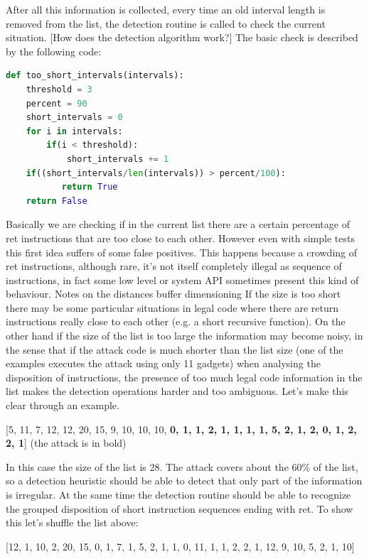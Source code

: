 \documentclass[Lau,binding=0.6cm]{sapthesis}
\begin{document}
After all this information is collected, every time an old interval length is removed from the list, the detection routine is called to check the current situation.
[How does the detection algorithm work?]
The basic check is described by the following code:

\begin{lstlisting}[language=Python]
def too_short_intervals(intervals):
    threshold = 3
    percent = 90
    short_intervals = 0
    for i in intervals:
        if(i < threshold):
            short_intervals += 1
    if((short_intervals/len(intervals)) > percent/100):
           return True
    return False
\end{lstlisting}

Basically we are checking if in the current list there are a certain percentage of ret instructions that are too close to each other. However even with simple tests this first idea suffers of some false positives. This happens because a crowding of ret instructions, although rare, it’s not itself completely illegal as sequence of instructions, in fact some low level or system API sometimes present this kind of behaviour.
Notes on the distances buffer dimensioning
If the size is too short there may be some particular situations in legal code where there are return instructions really close to each other (e.g. a short recursive function). On the other hand if the size of the list is too large the information may become noisy, in the sense that if the attack code is much shorter than the list size (one of the examples executes the attack using only 11 gadgets) when analysing the disposition of instructions, the presence of too much legal code information in the list makes the detection operations harder and too ambiguous.
Let’s make this clear through an example.

[5, 11, 7, 12, 12, 20, 15, 9, 10, 10, 10, \textbf{0, 1, 1, 2, 1, 1, 1, 1, 5, 2, 1, 2, 0, 1, 2, 2, 1}]
(the attack is in bold)

In this case the size of the list is 28. The attack covers about the 60\% of the list, so a detection heuristic should be able to detect that only part of the information is irregular. At the same time the detection routine should be able to recognize the grouped disposition of short instruction sequences ending with ret. To show this let’s shuffle the list above:

[12, 1, 10, 2, 20, 15, 0, 1, 7, 1, 5, 2, 1, 1, 0, 11, 1, 1, 2, 2, 1, 12, 9, 10, 5, 2, 1, 10]
\end{document}
